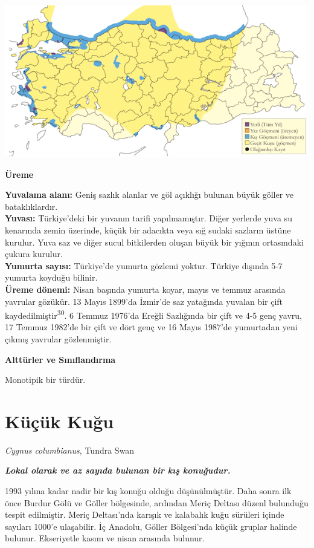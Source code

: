 \documentclass[
  letterpaper,
  DIV=11,
  numbers=noendperiod]{scrreprt}
\begin{document}
\includegraphics{images/harita_Page_008.png}

\textbf{Üreme}

\textbf{Yuvalama alanı:} Geniş sazlık alanlar ve göl açıklığı bulunan
büyük göller ve bataklıklardır.\\
\textbf{Yuvası:} Türkiye'deki bir yuvanın tarifi yapılmamıştır. Diğer
yerlerde yuva su kenarında zemin üzerinde, küçük bir adacıkta veya sığ
sudaki sazların üstüne kurulur. Yuva saz ve diğer sucul bitkilerden
oluşan büyük bir yığının ortasındaki çukura kurulur.\\
\textbf{Yumurta sayısı:} Türkiye'de yumurta gözlemi yoktur. Türkiye
dışında 5-7 yumurta koyduğu bilinir.\\
\textbf{Üreme dönemi:} Nisan başında yumurta koyar, mayıs ve temmuz
arasında yavrular gözükür. 13 Mayıs 1899'da İzmir'de saz yatağında
yuvalan bir çift kaydedilmiştir\textsuperscript{30}. 6 Temmuz 1976'da
Ereğli Sazlığında bir çift ve 4-5 genç yavru, 17 Temmuz 1982'de bir çift
ve dört genç ve 16 Mayıs 1987'de yumurtadan yeni çıkmış yavrular
gözlenmiştir.

\textbf{Alttürler ve Sınıflandırma}

Monotipik bir türdür.

\section{Küçük Kuğu}\label{kuxfcuxe7uxfck-kuux11fu}

\emph{Cygnus columbianus}, Tundra Swan

\textbf{\emph{Lokal olarak ve az sayıda bulunan bir kış konuğudur.}}

1993 yılına kadar nadir bir kış konuğu olduğu düşünülmüştür. Daha sonra
ilk önce Burdur Gölü ve Göller bölgesinde, ardından Meriç Deltası düzenl
bulunduğu tespit edilmiştir. Meriç Deltası'nda karışık ve kalabalık kuğu
sürüleri içinde sayıları 1000'e ulaşabilir. İç Anadolu, Göller
Bölgesi'nda küçük gruplar halinde bulunur. Ekseriyetle kasım ve nisan
arasında bulunur.
\end{document}
